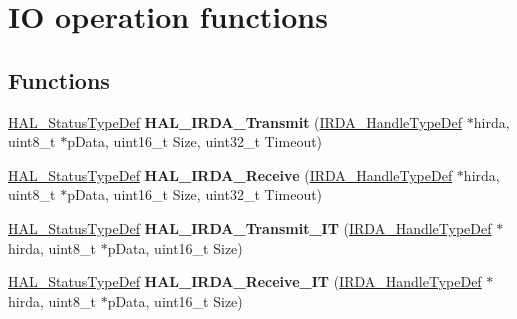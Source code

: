 \hypertarget{group___i_r_d_a___exported___functions___group2}{}\section{IO operation functions}
\label{group___i_r_d_a___exported___functions___group2}
\subsection*{Functions}
\begin{DoxyCompactItemize}
\item 
\mbox{\label{group___i_r_d_a___exported___functions___group2_ga8581077ae166780a2bd0c8d9b38c1ab2}} 
\hyperlink{stm32f0xx__hal__def_8h_a63c0679d1cb8b8c684fbb0632743478f}{H\+A\+L\+\_\+\+Status\+Type\+Def} {\bfseries H\+A\+L\+\_\+\+I\+R\+D\+A\+\_\+\+Transmit} (\hyperlink{struct_i_r_d_a___handle_type_def}{I\+R\+D\+A\+\_\+\+Handle\+Type\+Def} $\ast$hirda, uint8\+\_\+t $\ast$p\+Data, uint16\+\_\+t Size, uint32\+\_\+t Timeout)
\item 
\mbox{\label{group___i_r_d_a___exported___functions___group2_ga4148e8cd07056a07a827c537f2f7823c}} 
\hyperlink{stm32f0xx__hal__def_8h_a63c0679d1cb8b8c684fbb0632743478f}{H\+A\+L\+\_\+\+Status\+Type\+Def} {\bfseries H\+A\+L\+\_\+\+I\+R\+D\+A\+\_\+\+Receive} (\hyperlink{struct_i_r_d_a___handle_type_def}{I\+R\+D\+A\+\_\+\+Handle\+Type\+Def} $\ast$hirda, uint8\+\_\+t $\ast$p\+Data, uint16\+\_\+t Size, uint32\+\_\+t Timeout)
\item 
\mbox{\label{group___i_r_d_a___exported___functions___group2_gac6ea111f9cf4b8a89059708e2e8f1b81}} 
\hyperlink{stm32f0xx__hal__def_8h_a63c0679d1cb8b8c684fbb0632743478f}{H\+A\+L\+\_\+\+Status\+Type\+Def} {\bfseries H\+A\+L\+\_\+\+I\+R\+D\+A\+\_\+\+Transmit\+\_\+\+IT} (\hyperlink{struct_i_r_d_a___handle_type_def}{I\+R\+D\+A\+\_\+\+Handle\+Type\+Def} $\ast$hirda, uint8\+\_\+t $\ast$p\+Data, uint16\+\_\+t Size)
\item 
\mbox{\label{group___i_r_d_a___exported___functions___group2_ga0ea98454afb5ec16a39ba1b5b8142005}} 
\hyperlink{stm32f0xx__hal__def_8h_a63c0679d1cb8b8c684fbb0632743478f}{H\+A\+L\+\_\+\+Status\+Type\+Def} {\bfseries H\+A\+L\+\_\+\+I\+R\+D\+A\+\_\+\+Receive\+\_\+\+IT} (\hyperlink{struct_i_r_d_a___handle_type_def}{I\+R\+D\+A\+\_\+\+Handle\+Type\+Def} $\ast$hirda, uint8\+\_\+t $\ast$p\+Data, uint16\+\_\+t Size)

\end{DoxyCompactItemize}
